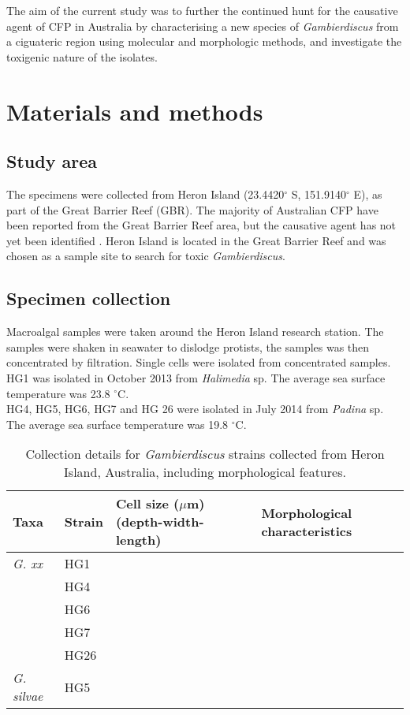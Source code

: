 \documentclass[12pt]{article}
\begin{document}
The aim of the current study was to further the continued hunt for the causative agent of CFP in Australia by characterising a new species of \emph{Gambierdiscus} from a ciguateric region using molecular and morphologic methods, and investigate the toxigenic nature of the isolates.
  
\section{Materials and methods}

\subsection{Study area}
The specimens were collected from Heron Island (23.4420$^{\circ}$ S, 151.9140$^{\circ}$ E), as part of the Great Barrier Reef (GBR). The majority of Australian CFP have been reported from the Great Barrier Reef area, but the causative agent has not yet been identified \cite{lewis2006ciguatera}. Heron Island is located in the Great Barrier Reef and was chosen as a sample site to search for toxic \emph{Gambierdiscus}.\\

\subsection{Specimen collection}
 
Macroalgal samples were taken around the Heron Island research station. The samples were shaken in seawater to dislodge protists, the samples was then concentrated by filtration. Single cells were isolated from concentrated samples.\\
HG1 was isolated in October 2013 from \emph{Halimedia} sp. The average sea surface temperature was 23.8 $^{\circ}$C. \\
HG4, HG5, HG6, HG7 and HG 26 were isolated in July 2014 from \emph{Padina} sp. The average sea surface temperature was 19.8 $^{\circ}$C.



\FloatBarrier
\begin{table}
\caption{Collection details for \emph{Gambierdiscus} strains collected from Heron Island, Australia, including morphological features.}
\label{tbl:StrainTable}
\begin{tabular}{ | p{2cm} | p{1.5cm} | p{4cm} | p{6cm} | }
\hline
\textbf{Taxa} & \textbf{Strain} & \textbf{Cell size ($\mu$m) (depth-width-length)}  & \textbf{Morphological characteristics} \\
 \hline
\emph{G. xx} & HG1 &  &    \\

 & HG4  &  &  \\

 & HG6  &  &   \\

&  HG7  &  &   \\

&  HG26  &  &   \\
  \hline
\emph{G. silvae}& HG5  & &   \\
  \hline
\end{tabular}
\end{table}
\FloatBarrier
\end{document}
